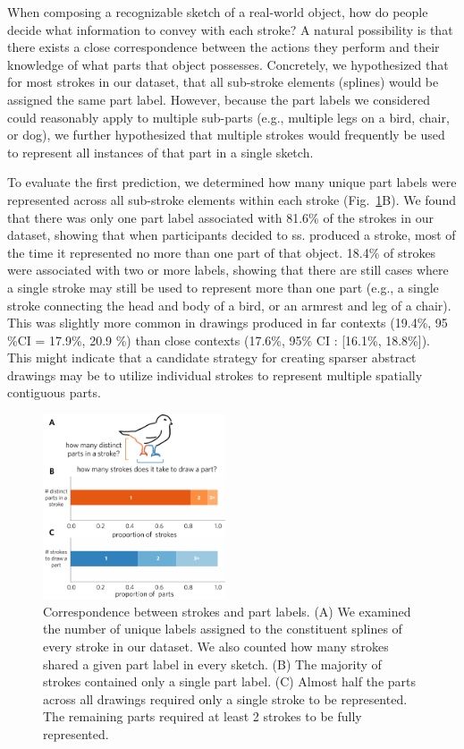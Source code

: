 \documentclass[10pt,letterpaper]{article}
\begin{document}
When composing a recognizable sketch of a real-world object, how do people decide what information to convey with each stroke? 
A natural possibility is that there exists a close correspondence between the actions they perform and their knowledge of what parts that object possesses. %
Concretely, we hypothesized that for most strokes in our dataset, that all sub-stroke elements (splines) would be assigned the same part label. 
However, because the part labels we considered could reasonably apply to multiple sub-parts (e.g., multiple legs on a bird, chair, or dog), we further hypothesized that multiple strokes would frequently be used to represent all instances of that part in a single sketch.

To evaluate the first prediction, we determined how many unique part labels were represented across all sub-stroke elements within each stroke (Fig.~\ref{stroke_to_part}B). 
We found that there was only one part label associated with 81.6\% of the strokes in our dataset, showing that when participants decided to  ss. produced a stroke, most of the time it represented no more than one part of that object. 
18.4\% of strokes were associated with two or more labels, showing that there are still cases where a single stroke may still be used to represent more than one part (e.g., a single stroke connecting the head and body of a bird, or an armrest and leg of a chair). 
This was slightly more common in drawings produced in far contexts (19.4\%, 95 \%CI = 17.9\%, 20.9 \%) than close contexts (17.6\%, 95\% CI : [16.1\%, 18.8\%]).  This might indicate that a candidate strategy for creating sparser abstract drawings may be to utilize individual strokes to represent multiple spatially contiguous parts. 

\begin{figure}[htbp]
\centering
\includegraphics[width=0.48\textwidth]{figures/5_stroke_part_relationship.pdf}
\caption{Correspondence between strokes and part labels. (A) We examined the number of unique labels assigned to the constituent splines of every stroke in our dataset. We also counted how many strokes shared a given part label in every sketch. (B) The majority of strokes contained only a single part label. (C) Almost half the parts across all drawings required only a single stroke to be represented. The remaining parts required at least 2 strokes to be fully represented. }
\label{stroke_to_part}
\end{figure}
\end{document}
